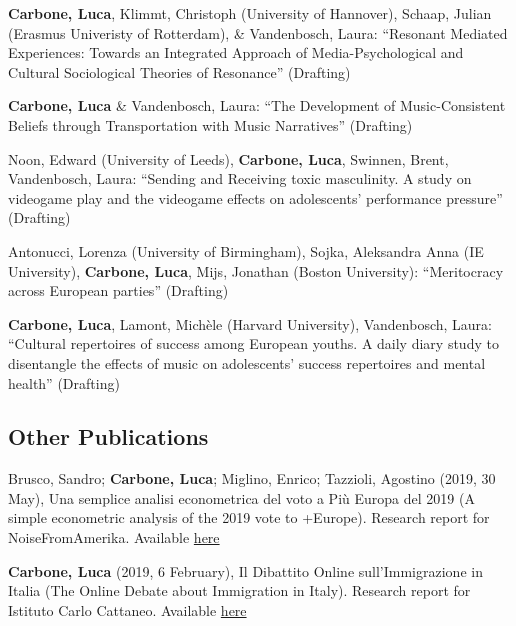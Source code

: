 \documentclass[12pt,]{article}
\begin{document}
\textbf{Carbone, Luca}, Klimmt, Christoph (University of Hannover),
Schaap, Julian (Erasmus Univeristy of Rotterdam), \& Vandenbosch, Laura:
``Resonant Mediated Experiences: Towards an Integrated Approach of
Media-Psychological and Cultural Sociological Theories of Resonance''
(Drafting) \newline

\textbf{Carbone, Luca} \& Vandenbosch, Laura: ``The Development of
Music-Consistent Beliefs through Transportation with Music Narratives''
(Drafting) \newline

Noon, Edward (University of Leeds), \textbf{Carbone, Luca}, Swinnen,
Brent, Vandenbosch, Laura: ``Sending and Receiving toxic masculinity. A
study on videogame play and the videogame effects on adolescents'
performance pressure'' (Drafting) \newline

Antonucci, Lorenza (University of Birmingham), Sojka, Aleksandra Anna
(IE University), \textbf{Carbone, Luca}, Mijs, Jonathan (Boston
University): ``Meritocracy across European parties'' (Drafting) \newline

\textbf{Carbone, Luca}, Lamont, Michèle (Harvard University),
Vandenbosch, Laura: ``Cultural repertoires of success among European
youths. A daily diary study to disentangle the effects of music on
adolescents' success repertoires and mental health'' (Drafting) \newline

\hypertarget{other-publications}{%
\subsection{Other Publications}\label{other-publications}}

Brusco, Sandro; \textbf{Carbone, Luca}; Miglino, Enrico; Tazzioli,
Agostino (2019, 30 May), Una semplice analisi econometrica del voto a
Più Europa del 2019 (A simple econometric analysis of the 2019 vote to
+Europe). Research report for NoiseFromAmerika. Available
\href{http://noisefromamerika.org/articolo/semplice-analisi-econometrica-voto-piu-europa-2019?fbclid=IwAR12kLTGJAonRf3Ctb-HlXYBGAspUhOSclDpQCg-mis-mDzM9vY8kZU21v8}{here}

\textbf{Carbone, Luca} (2019, 6 February), Il Dibattito Online
sull'Immigrazione in Italia (The Online Debate about Immigration in
Italy). Research report for Istituto Carlo Cattaneo. Available
\href{http://www.cattaneo.org/2019/02/06/il-dibattito-online-sullimmigrazione-in-italia/}{here}
\end{document}
